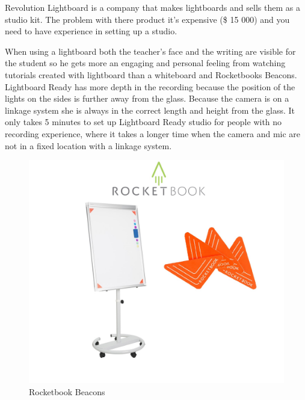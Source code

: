 \documentclass[a4paper]{jpconf}
\begin{document}
Revolution Lightboard is a company that makes lightboards and sells them as a studio kit. The problem with there product it's expensive (\$ 15 000) and you need to have experience in setting up a studio\cite{Revolution}.

When using a lightboard both the teacher's face and the writing are visible for the student so he gets more an engaging and personal feeling from watching tutorials created with lightboard than a whiteboard and Rocketbooks Beacons.
Lightboard Ready has more depth in the recording because the position of the lights on the sides is further away from the glass.
Because the camera is on a linkage system she is always in the correct length and height from the glass.  
It only takes 5 minutes to set up Lightboard Ready studio for people with no recording experience, where it takes a longer time when the camera and mic are not in a fixed location with a linkage system.





\begin{figure}
	\centering
	\includegraphics[width=0.7\linewidth]{becons.png}
	\caption{Rocketbook Beacons \cite{Rocketbook}}
	\label{fig:ROCK}
\end{figure}
\end{document}
